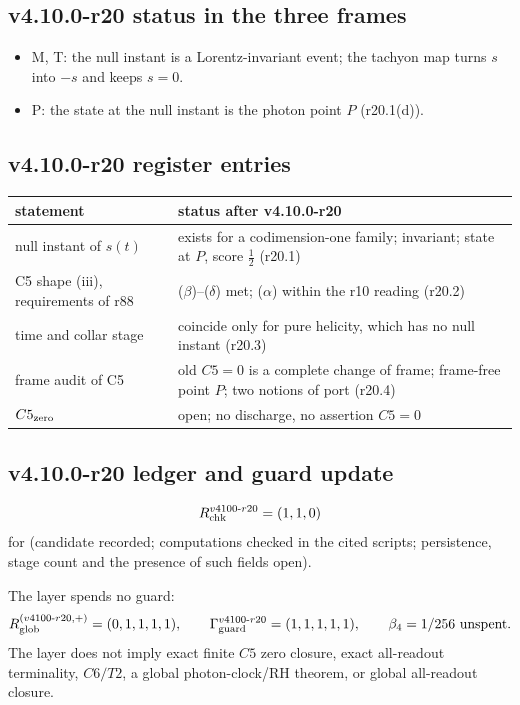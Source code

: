 \subsection*{v4.10.0-r20 status in the three frames}
\label{subsec:v4100-r20-frames}

\begin{itemize}[leftmargin=2em]
\item M, T: the null instant is a Lorentz-invariant event; the tachyon map turns \(s\) into \(-s\) and keeps \(s=0\).
\item P: the state at the null instant is the photon point \(P\) (r20.1(d)).
\end{itemize}

\subsection*{v4.10.0-r20 register entries}
\label{subsec:v4100-r20-register}

\begin{center}
\small
\begin{tabular}{@{}>{\raggedright\arraybackslash}p{}>{\raggedright\arraybackslash}p{}@{}}
\toprule
statement & status after v4.10.0-r20\\
\midrule
null instant of \(s(t)\) & exists for a codimension-one family; invariant; state at \(P\), score \(\tfrac12\) (r20.1)\\
C5 shape (iii), requirements of r88 & (\(\beta\))--(\(\delta\)) met; (\(\alpha\)) within the r10 reading (r20.2)\\
time and collar stage & coincide only for pure helicity, which has no null instant (r20.3)\\
frame audit of C5 & old \(C5=0\) is a complete change of frame; frame-free point \(P\); two notions of port (r20.4)\\
\(C5_{\rm zero}\) & open; no discharge, no assertion \(C5=0\)\\
\bottomrule
\end{tabular}
\end{center}

\subsection*{v4.10.0-r20 ledger and guard update}
\label{subsec:v4100-r20-ledger-guard}

\[
R_{\rm chk}^{v4100\text{-}r20}=(1,1,0)
\]
for (candidate recorded; computations checked in the cited scripts; persistence, stage count and the presence of such fields open).

The layer spends no guard:
\[
R_{\rm glob}^{(v4100\text{-}r20,+)}=(0,1,1,1,1),
\qquad
\Gamma_{\rm guard}^{v4100\text{-}r20}=(1,1,1,1,1),
\qquad
\beta_4=1/256\ \text{unspent}.
\]
The layer does not imply exact finite \(C5\) zero closure, exact all-readout terminality, \(C6/T2\), a global photon-clock/RH theorem,
or global all-readout closure.
